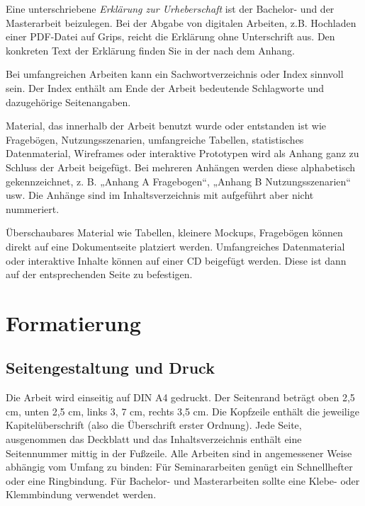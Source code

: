 
Eine unterschriebene \emph{Erklärung zur Urheberschaft} ist der Bachelor- und der Masterarbeit beizulegen. Bei der Abgabe von digitalen Arbeiten, z.B. Hochladen einer PDF-Datei auf Grips, reicht die Erklärung ohne Unterschrift aus.
Den konkreten Text der Erklärung finden Sie in der nach dem Anhang.


Bei umfangreichen Arbeiten kann ein Sachwortverzeichnis oder Index sinnvoll sein.
Der Index enthält am Ende der Arbeit bedeutende Schlagworte und dazugehörige Seitenangaben.


Material, das innerhalb der Arbeit benutzt wurde oder entstanden ist wie Fragebögen, Nutzungsszenarien, umfangreiche Tabellen, statistisches Datenmaterial, Wireframes oder interaktive Prototypen wird als Anhang ganz zu Schluss der Arbeit beigefügt.
Bei mehreren Anhängen werden diese alphabetisch gekennzeichnet, z. B. „Anhang A Fragebogen“, „Anhang B Nutzungsszenarien“ usw.
Die Anhänge sind im Inhaltsverzeichnis mit aufgeführt aber nicht nummeriert.

Überschaubares Material wie Tabellen, kleinere Mockups, Fragebögen können direkt auf eine Dokumentseite platziert werden.
Umfangreiches Datenmaterial oder interaktive Inhalte können auf einer CD beigefügt werden.
Diese ist dann auf der entsprechenden Seite zu befestigen. 

\section{Formatierung}\label{subsec:formatierung}

\subsection{Seitengestaltung und Druck}\label{subsubsec:seitengestaltung}

Die Arbeit wird einseitig auf DIN A4 gedruckt. Der Seitenrand beträgt oben 2,5 cm, unten 2,5 cm, links 3, 7 cm, rechts 3,5 cm. Die Kopfzeile enthält die jeweilige Kapitelüberschrift (also die Überschrift erster Ordnung).
Jede Seite, ausgenommen das Deckblatt und das Inhaltsverzeichnis enthält eine Seitennummer mittig in der Fußzeile.
Alle Arbeiten sind in angemessener Weise abhängig vom Umfang zu binden: Für Seminararbeiten genügt ein Schnellhefter oder eine Ringbindung. Für Bachelor- und Masterarbeiten sollte eine Klebe- oder Klemmbindung verwendet werden.


